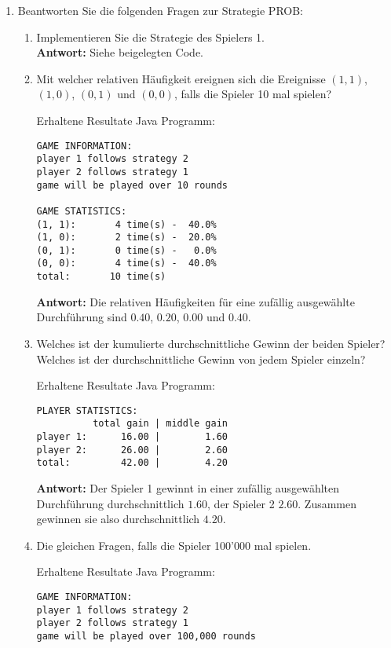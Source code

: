 \documentclass[12pt,a4paper]{article}
\begin{document}
\begin{enumerate}

\item Beantworten Sie die folgenden Fragen zur Strategie PROB: 
\begin{enumerate}
\item Implementieren Sie die Strategie des Spielers 1.\\
\textbf{Antwort:} Siehe beigelegten Code.

\item Mit welcher relativen Häufigkeit ereignen sich die Ereignisse $(1, 1)$, $(1, 0)$, $(0, 1)$ und $(0, 0)$, falls die Spieler 10 mal spielen?\\
\begin{center}Erhaltene Resultate Java Programm:\end{center}
\begin{verbatim}
GAME INFORMATION:
player 1 follows strategy 2
player 2 follows strategy 1
game will be played over 10 rounds

GAME STATISTICS:
(1, 1):       4 time(s) -  40.0%
(1, 0):       2 time(s) -  20.0%
(0, 1):       0 time(s) -   0.0%
(0, 0):       4 time(s) -  40.0%
total:       10 time(s)
\end{verbatim}
\textbf{Antwort:} Die relativen Häufigkeiten für eine zufällig ausgewählte Durchführung sind $0.40$, $0.20$, $0.00$ und $0.40$.
\newpage

\item Welches ist der kumulierte durchschnittliche Gewinn der beiden Spieler?
Welches ist der durchschnittliche Gewinn von jedem Spieler einzeln?\\
\begin{center}Erhaltene Resultate Java Programm:\end{center}
\begin{verbatim}
PLAYER STATISTICS:
          total gain | middle gain
player 1:      16.00 |        1.60
player 2:      26.00 |        2.60
total:         42.00 |        4.20
\end{verbatim}
\textbf{Antwort:} Der Spieler 1 gewinnt in einer zufällig ausgewählten Durchführung durchschnittlich $1.60$, der Spieler 2 $2.60$.
Zusammen gewinnen sie also durchschnittlich $4.20$.

\item Die gleichen Fragen, falls die Spieler 100'000 mal spielen.\\
\begin{center}Erhaltene Resultate Java Programm:\end{center}
\begin{verbatim}
GAME INFORMATION:
player 1 follows strategy 2
player 2 follows strategy 1
game will be played over 100,000 rounds


\end{verbatim}
\end{enumerate}
\end{enumerate}
\end{document}
